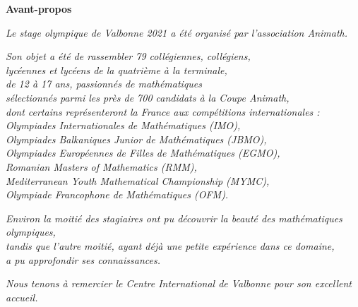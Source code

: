 \begin{flushright}

\textbf{\Large{Avant-propos}}

\bigskip

\emph{Le stage olympique de Valbonne 2021 a été organisé par l'association Animath.}

\bigskip

\emph{Son objet a été de rassembler 79 collégiennes, collégiens,\\
lycéennes et lycéens de la quatrième à la terminale, \\
de 12 à 17 ans, passionnés de mathématiques \\
sélectionnés parmi les près de 700 candidats à la Coupe Animath, \\
dont certains représenteront la France aux compétitions internationales : \\
Olympiades Internationales de Mathématiques (IMO), \\
Olympiades Balkaniques Junior de Mathématiques (JBMO), \\
Olympiades Européennes de Filles de Mathématiques (EGMO), \\
Romanian Masters of Mathematics (RMM), \\ 
Mediterranean Youth Mathematical Championship (MYMC), \\
Olympiade Francophone de Mathématiques (OFM).}

\bigskip

\emph{
Environ la moitié des stagiaires ont pu découvrir la beauté des mathématiques olympiques,\\
tandis que l'autre moitié, ayant déjà une petite expérience dans ce domaine,\\
a pu approfondir ses connaissances.\\
}
 
\vspace{3cm}

\emph{Nous tenons à remercier le Centre International de Valbonne pour son excellent accueil.}
\end{flushright}




\pagebreak

\mbox { }

\pagebreak


